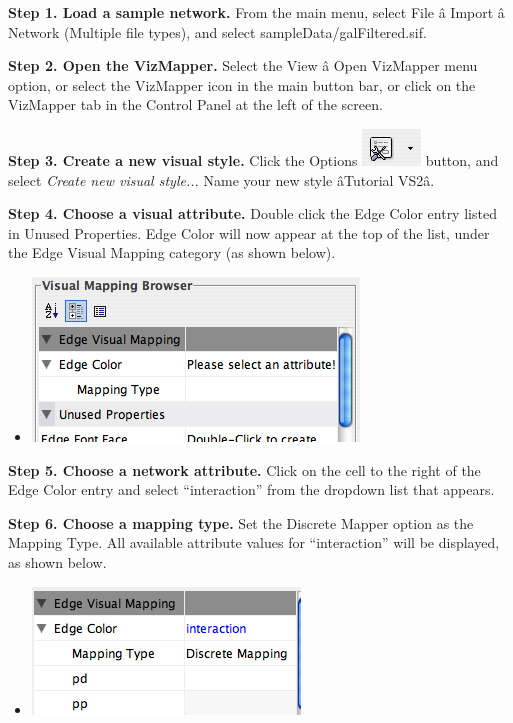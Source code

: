  \textbf{Step 1. Load a sample network.}
 From the main menu, select File \^a Import \^a Network (Multiple file types), and select sampleData/galFiltered.sif. 


 \textbf{Step 2. Open the VizMapper.}
 Select the View \^a Open VizMapper menu option, or select the VizMapper icon in the main button bar, or click on the VizMapper tab in the Control Panel at the left of the screen. 


 \textbf{Step 3. Create a new visual style.}
 Click the Options \includegraphics[width=.6\textwidth]{images/VizMapOptionIcon.png}  button, and select \emph{Create new visual style...}
 Name your new style \^aTutorial VS2\^a. 


 \textbf{Step 4. Choose a visual attribute.}
 Double click the Edge Color entry listed in Unused Properties. Edge Color will now appear at the top of the list, under the Edge Visual Mapping category (as shown below). 
\begin{itemize}
\item 

 \includegraphics[width=.6\textwidth]{images/EdgeMapping1.png} 


\end{itemize}


 \textbf{Step 5. Choose a network attribute.}
 Click on the cell to the right of the Edge Color entry and select ``interaction'' from the dropdown list that appears. 


 \textbf{Step 6. Choose a mapping type.}
 Set the Discrete Mapper option as the Mapping Type. All available attribute values for ``interaction'' will be displayed, as shown below. 
\begin{itemize}
\item 

 \includegraphics[width=.6\textwidth]{images/EdgeMapping2.png} 


\end{itemize}


